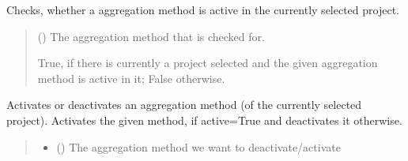 \documentclass[letterpaper,10pt,english]{sphinxmanual}
\begin{document}
\begin{fulllineitems}
\begin{fulllineitems}
\label{\detokenize{apidoc/src.osm_configurator.control:src.osm_configurator.control.control.Control.is_aggregation_method_active}}
\pysigstartsignatures
{}
\pysigstopsignatures
\sphinxAtStartPar
Checks, whether a aggregation method is active in the currently selected project.
\begin{quote}\begin{description}
\sphinxAtStartPar
{} ({\hyperref[\detokenize{apidoc/src.osm_configurator.model.project.calculation:src.osm_configurator.model.project.calculation.aggregation_method_enum.AggregationMethod}]{}}) \textendash{} The aggregation method that is checked for.

\sphinxAtStartPar
True, if there is currently a project selected and the given aggregation method is active in it; False otherwise.

\sphinxAtStartPar
{}

\end{description}\end{quote}

\end{fulllineitems}


\begin{fulllineitems}
\label{\detokenize{apidoc/src.osm_configurator.control:src.osm_configurator.control.control.Control.set_aggregation_method_active}}
\pysigstartsignatures
{}
\pysigstopsignatures
\sphinxAtStartPar
Activates or deactivates an aggregation method (of the currently selected project).
Activates the given method, if active=True and deactivates it otherwise.
\begin{quote}\begin{description}
\begin{itemize}
\item {} 
\sphinxAtStartPar
{} ({\hyperref[\detokenize{apidoc/src.osm_configurator.model.project.calculation:src.osm_configurator.model.project.calculation.aggregation_method_enum.AggregationMethod}]{}}) \textendash{} The aggregation method we want to deactivate/activate


\end{itemize}
\end{description}
\end{quote}
\end{fulllineitems}
\end{fulllineitems}
\end{document}
